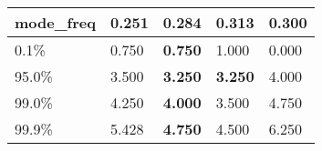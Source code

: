 \begin{table}[H]
\begin{tabular}{|l|m{10em}|m{10em}|m{10em}|m{10em}|}
\hline mode\_freq & 0.251 & \bfseries 0.284 & \cellcolor[rgb]{0.9, 0.54, 0.52} 0.313 & 0.300 \\
\hline 0.1\% & 0.750 & \bfseries 0.750 & 1.000 & \cellcolor[rgb]{0.9, 0.54, 0.52} 0.000 \\
\hline 95.0\% & 3.500 & \bfseries 3.250 & \bfseries 3.250 & \cellcolor[rgb]{0.9, 0.54, 0.52} 4.000 \\
\hline 99.0\% & 4.250 & \bfseries 4.000 & \cellcolor[rgb]{0.9, 0.54, 0.52} 3.500 & 4.750 \\
\hline 99.9\% & 5.428 & \bfseries 4.750 & \cellcolor[rgb]{0.9, 0.54, 0.52} 4.500 & 6.250 \\
\hline
\end{tabular}
\end{table}
